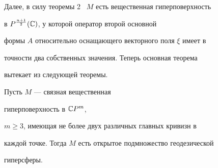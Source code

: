 Далее, в силу теоремы 2 \ $M$ есть вещественная гиперповерхность


в $P^{\frac{n+1}{2}}(\Bbb C)$, у которой оператор второй основной


формы $A$ относительно оснащающего векторного поля $\xi$ имеет в


точности два собственных значения. Теперь основная теорема


вытекает из следующей теоремы.








\begin{athm}


Пусть $M$ --- связная вещественная


гиперповерхность в $\Bbb CP^m$,


$m\ge 3$, имеющая не более двух различных главных кривизн в


каждой точке. Тогда $M$ есть открытое подмножество геодезической


гиперсферы. 


\end{athm}








